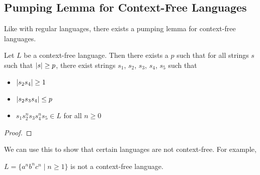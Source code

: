 \subsection{Pumping Lemma for Context-Free Languages}\label{pumping-lemma-for-context-free-languages}

Like with regular languages, there exists a pumping lemma for context-free languages. 

\begin{theorem}
    Let \(L\) be a context-free language. Then there exists a \(p\) such that for all strings \(s\) such that \(\abs{s}\geq p\), there exist strings \(s_1\), \(s_2\), \(s_3\), \(s_4\), \(s_5\) such that 
    \begin{itemize}
        \item \(\abs{s_2 s_4}\geq 1\)
        \item \(\abs{s_2 s_3 s_4}\leq p\)
        \item \(s_1 s_2^n s_3 s_4^n s_5\in L\) for all \(n\geq0\)
  \end{itemize}
\end{theorem}

\begin{proof}

\end{proof}

We can use this to show that certain languages are not context-free. For example, 

\begin{theorem}
    \(L=\{a^n b^n c^n\mid n\geq1\} \) is not a context-free language.
\end{theorem}

